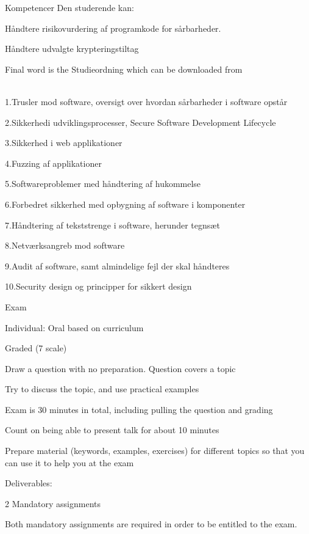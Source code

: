 \documentclass[Screen16to9,17pt]{foils}
\begin{document}
Kompetencer Den studerende kan:
\begin{list2}
\item Håndtere risikovurdering af programkode for sårbarheder.
\item Håndtere udvalgte krypteringstiltag
\end{list2}

Final word is the Studieordning which can be downloaded from\\
{\footnotesize {}\\
}



\begin{list2}
\item 1.Trusler mod software, oversigt over hvordan sårbarheder i software opstår
\item 2.Sikkerhedi udviklingsprocesser, Secure Software Development Lifecycle
\item 3.Sikkerhed i web applikationer
\item 4.Fuzzing af applikationer
\item 5.Softwareproblemer med håndtering af hukommelse
\item 6.Forbedret sikkerhed med opbygning af software i komponenter
\item 7.Håndtering af tekststrenge i software, herunder tegnsæt
\item 8.Netværksangreb mod software
\item 9.Audit af software, samt almindelige fejl der skal håndteres
\item 10.Security design og principper for sikkert design
\end{list2}


\begin{list2}
\item Exam
\item Individual: Oral based on curriculum
\item Graded (7 scale)
\item Draw a question with no preparation. Question covers a topic
\item Try to discuss the topic, and use practical examples
\item Exam is 30 minutes in total, including pulling the question and grading
\item Count on being able to present talk for about 10 minutes
\item Prepare material (keywords, examples, exercises) for different topics so that you can use it to help you at the exam

\vskip 5mm
\item Deliverables:
\item 2 Mandatory assignments
\item Both mandatory assignments are required in order to be entitled to the exam.
\end{list2}
\end{document}
